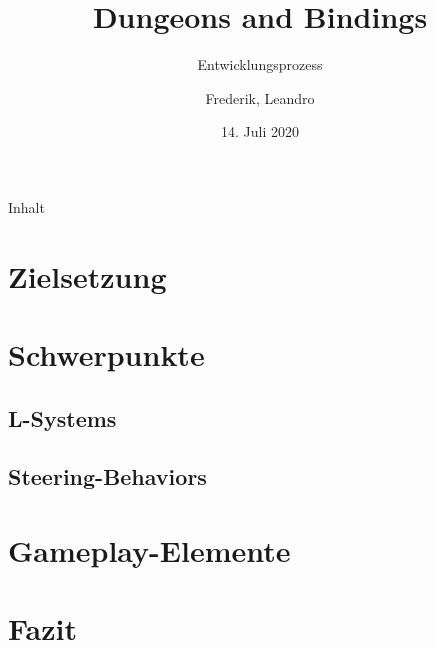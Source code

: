 \documentclass{beamer}
\title{Dungeons and Bindings}
\subtitle{Entwicklungsprozess}
\author{Frederik, Leandro}
\institute{TU Dortmund}
\date{14. Juli 2020}
\begin{document}
\begin{frame}
\titlepage
\end{frame}

\begin{frame}{Inhalt}
\tableofcontents
\end{frame}

\section{Zielsetzung}


\section{Schwerpunkte}

\subsection{L-Systems}


\subsection{Steering-Behaviors}


\section{Gameplay-Elemente}


\section{Fazit}

\end{document}
